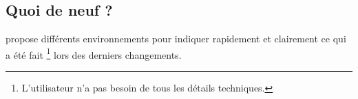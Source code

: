 \documentclass[10pt, a4paper]{article}
\begin{document}

\subsection{Quoi de neuf ?}
 propose différents environnements pour indiquer rapidement et clairement ce qui a été fait
\footnote{
	L'utilisateur n'a pas besoin de tous les détails techniques.
}
lors des derniers changements.


\begin{tdocexa}
	\leavevmode

\end{tdocexa}




\begin{tdocexa}
	\leavevmode

\end{tdocexa}




\begin{tdocexa}
	\leavevmode

\end{tdocexa}




\begin{tdocexa}
	\leavevmode

\end{tdocexa}
\end{document}
